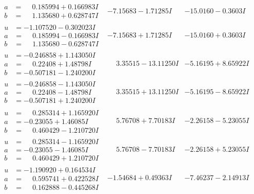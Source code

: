 \documentclass[1p]{elsarticle_modified}
\theoremstyle{definition}
\begin{document}
$$\begin{array}{c|c|c}
\begin{aligned}
a &= \phantom{-}0.185994 + 0.166983 I \\
b &= \phantom{-}1.135680 + 0.628747 I\end{aligned}
 & -7.15683 - 1.71285 I & -15.0160 - 0.3603 I \\ \hline\begin{aligned}
u &= -1.107520 - 0.302023 I \\
a &= \phantom{-}0.185994 - 0.166983 I \\
b &= \phantom{-}1.135680 - 0.628747 I\end{aligned}
 & -7.15683 + 1.71285 I & -15.0160 + 0.3603 I \\ \hline\begin{aligned}
u &= -0.246858 + 1.143050 I \\
a &= \phantom{-}0.22408 + 1.48798 I \\
b &= -0.507181 - 1.240200 I\end{aligned}
 & \phantom{-}3.35515 - 13.11250 I & -5.16195 + 8.65922 I \\ \hline\begin{aligned}
u &= -0.246858 - 1.143050 I \\
a &= \phantom{-}0.22408 - 1.48798 I \\
b &= -0.507181 + 1.240200 I\end{aligned}
 & \phantom{-}3.35515 + 13.11250 I & -5.16195 - 8.65922 I \\ \hline\begin{aligned}
u &= \phantom{-}0.285314 + 1.165920 I \\
a &= -0.23055 + 1.46085 I \\
b &= \phantom{-}0.460429 - 1.210720 I\end{aligned}
 & \phantom{-}5.76708 + 7.70183 I & -2.26158 - 5.23055 I \\ \hline\begin{aligned}
u &= \phantom{-}0.285314 - 1.165920 I \\
a &= -0.23055 - 1.46085 I \\
b &= \phantom{-}0.460429 + 1.210720 I\end{aligned}
 & \phantom{-}5.76708 - 7.70183 I & -2.26158 + 5.23055 I \\ \hline\begin{aligned}
u &= -1.190920 + 0.164534 I \\
a &= \phantom{-}0.595741 + 0.422528 I \\
b &= \phantom{-}0.162888 - 0.445268 I\end{aligned}
 & -1.54684 + 0.49363 I & -7.46237 - 2.14913 I \\ \hline\begin{aligned}

\end{aligned}
\end{array}$$
\end{document}
